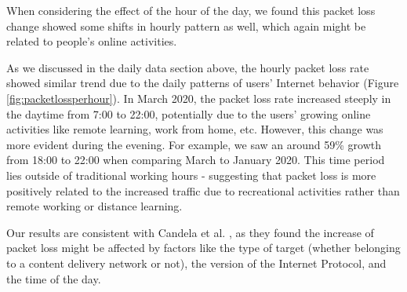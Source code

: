 When considering the effect of the hour of the day, we found this packet loss change showed some shifts in hourly pattern as well, which again might be related to people's online activities.

As we discussed in the daily data section above, the hourly packet loss rate showed similar trend due to the daily patterns of users’ Internet behavior (Figure \ref{fig:packetlossperhour}). In March 2020, the packet loss rate increased steeply in the daytime from 7:00 to 22:00, potentially due to the users' growing online activities like remote learning, work from home, etc. However, this change was more evident during the evening. For example, we saw an around 59\% growth from 18:00 to 22:00 when comparing March to January 2020. This time period lies outside of traditional working hours - suggesting that packet loss is more positively related to the increased traffic due to recreational activities rather than remote working or distance learning. 

Our results are consistent with Candela et al. \cite{Candela2020latency}, as they found the increase of packet loss might be affected by factors like the type of target (whether belonging to a content delivery network or not), the version of the Internet Protocol, and the time of the day.


